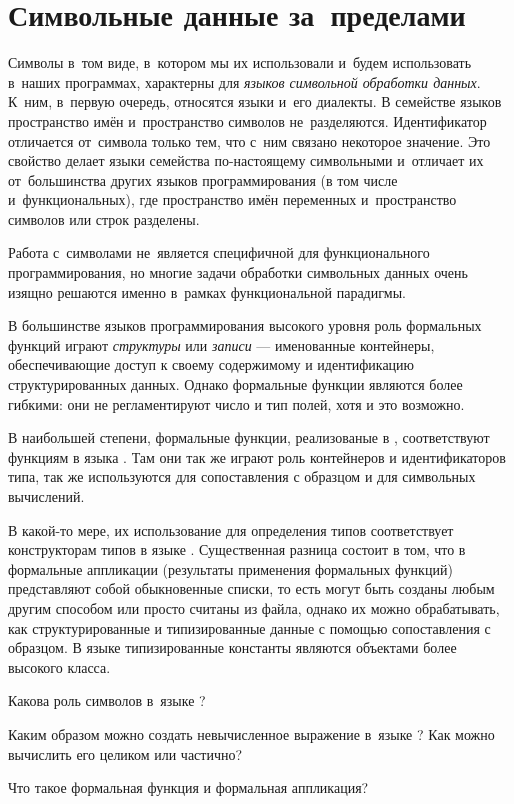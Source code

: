 \section{Символьные данные \mbox{за~пределами~\Scheme}}%
Символы в~том виде, в~котором мы их использовали и~будем использовать в~наших программах, характерны для \emph{языков символьной обработки данных}. К~ним, в~первую очередь, относятся языки  \Lisp и~его диалекты.
В семействе языков \Lisp пространство имён и~пространство символов не~разделяются. Идентификатор отличается от~символа только тем, что с~ним связано некоторое значение. Это свойство делает языки семейства \Lisp по-настоящему символьными и~отличает их от~большинства других языков программирования (в том числе и~функциональных), где пространство имён переменных и~пространство символов или строк разделены.

Работа с~символами не~является специфичной для функционального программирования, но многие задачи обработки символьных данных очень изящно решаются именно в~рамках функциональной парадигмы. 

В большинстве языков программирования высокого уровня роль формальных функций играют \emph{структуры} или \emph{записи} --- именованные контейнеры, обеспечивающие доступ к своему содержимому и идентификацию структурированных данных. Однако  формальные функции являются более гибкими: они не регламентируют число и тип полей, хотя и это возможно.

В наибольшей степени, формальные функции, реализованые в \Scheme, соответствуют функциям в языка . Там они так же играют роль контейнеров и идентификаторов типа, так же используются для сопоставления с образцом и для символьных вычислений.

В какой-то мере, их использование для определения типов соответствует конструкторам типов в языке . Существенная разница состоит в том, что в \Scheme формальные аппликации (результаты применения формальных функций) представляют собой обыкновенные списки, то есть могут быть созданы любым другим способом или просто считаны из файла, однако их можно обрабатывать, как структурированные и типизированные данные с помощью сопоставления с образцом. В языке  типизированные константы являются объектами более высокого класса.

\begin{Queeze}
 \item Какова роль символов в~языке \Scheme?

 \item Каким образом можно создать невычисленное выражение в~языке \Scheme? Как можно вычислить его целиком или частично?

 \item Что такое формальная функция и формальная аппликация?
\end{Queeze}
